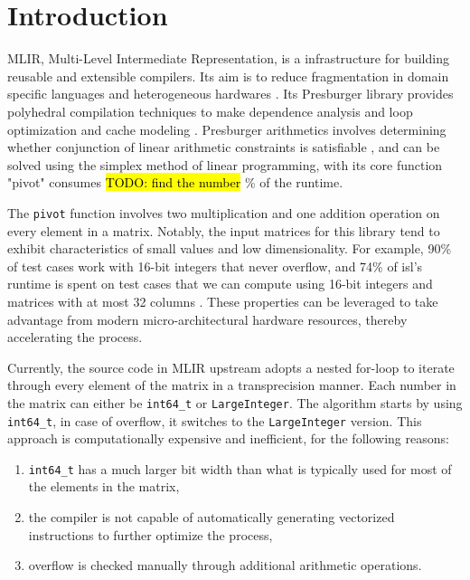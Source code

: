 \documentclass[logo,bsc,singlespacing,parskip]{infthesis}
\begin{document}
\chapter{Introduction}
\label{sec:introduction}

MLIR, Multi-Level Intermediate Representation, is a infrastructure for building
reusable and extensible compilers. Its aim is to reduce fragmentation in domain
specific languages and heterogeneous hardwares \cite{mlir}. Its Presburger
library provides polyhedral compilation techniques to make dependence analysis
and loop optimization \cite{mliraffine} and cache modeling \cite{CacheModel}.
Presburger arithmetics involves determining whether conjunction of linear
arithmetic constraints is satisfiable \cite{SMLPPA}, and can be solved using the
simplex method of linear programming, with its core function "pivot" consumes
\hl{TODO: find the number} \% \cite{FPL1} of the runtime. 

The \texttt{pivot} function involves two multiplication and one addition
operation on every element in a matrix. Notably, the input matrices for this
library tend to exhibit characteristics of small values and low dimensionality.
For example, 90\% of test cases work with 16-bit integers that never overflow,
and 74\% of isl’s runtime is spent on test cases that we can compute using
16-bit integers and matrices with at most 32 columns \cite{FPL2}. These
properties can be leveraged to take advantage from modern micro-architectural
hardware resources, thereby accelerating the process.

Currently, the source code in MLIR upstream adopts a nested for-loop to iterate
through every element of the matrix in a transprecision manner. Each number in
the matrix can either be \texttt{int64\_t} or \texttt{LargeInteger}. The
algorithm starts by using \texttt{int64\_t}, in case of overflow, it switches to
the \texttt{LargeInteger} version. This approach is computationally expensive
and inefficient, for the following reasons: 
\begin{enumerate}

\item \texttt{int64\_t} has a much larger bit width than what is typically
used for most of the elements in the matrix,

\item the compiler is not capable of automatically generating vectorized
instructions to further optimize the process,

\item overflow is checked manually through additional arithmetic
operations.

\end{enumerate}
\end{document}
